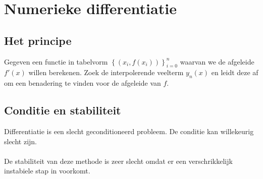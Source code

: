 \documentclass[samenvatting.tex]{subfiles}
\begin{document}
\chapter{Numerieke differentiatie}
\section{Het principe}
Gegeven een functie in tabelvorm $\left\{ (x_i,f(x_i))\right\}_{i=0}^{n}$ waarvan we de afgeleide $f'(x)$ willen berekenen. Zoek de interpolerende veelterm $y_n(x)$ en leidt deze af om een benadering te vinden voor de afgeleide van $f$.

\section{Conditie en stabiliteit}
Differentiatie is een slecht geconditioneerd probleem. De conditie kan willekeurig slecht zijn.\\\\
De stabiliteit van deze methode is zeer slecht omdat er een verschrikkelijk instabiele stap in voorkomt.
\end{document}

